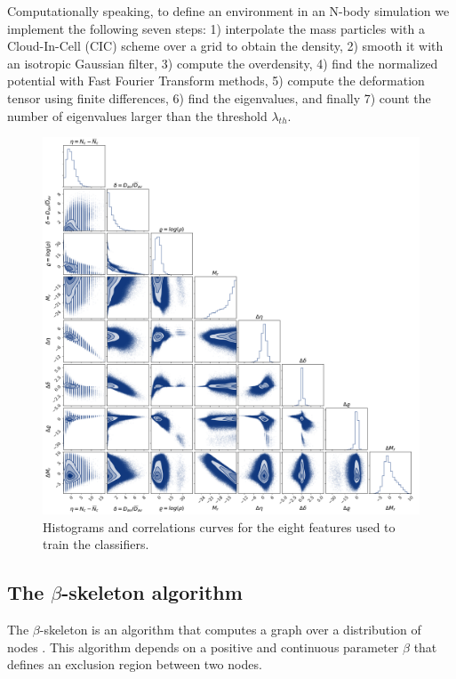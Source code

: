 \documentclass[usenatbib]{mnras}
\begin{document}
Computationally speaking, to define an environment in an N-body
simulation we implement the following seven steps: 1) interpolate the
mass particles with a Cloud-In-Cell  (CIC) scheme over a grid to
obtain the density, 2) smooth it with an isotropic Gaussian filter,
3) compute the overdensity, 4) find the normalized potential with Fast
Fourier Transform  methods, 5) compute the deformation tensor using
finite differences, 6) find the eigenvalues, and finally 7) count the number of eigenvalues larger than the threshold $\lambda_{th}$. 




\begin{figure}
        \includegraphics[scale=0.37]{Figs/p_all_features_correlations.pdf}
    \caption{Histograms and correlations curves for the eight features
      used to train the classifiers.}  
    \label{fig:features}
\end{figure}

\subsection{The $\beta$-skeleton algorithm}

The $\beta$-skeleton is an algorithm that computes a graph over a
distribution of nodes \citep{Kirkpatrick1985, Fang2019}.  
This algorithm depends on a positive and continuous parameter $\beta$
that defines an exclusion region between two nodes.
\end{document}
